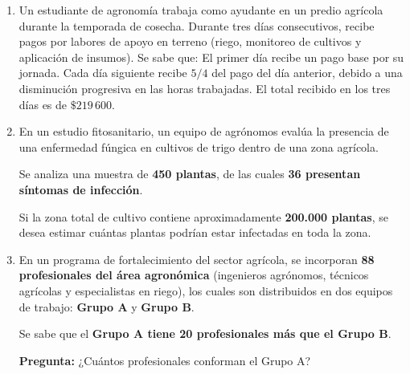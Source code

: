 \documentclass[11pt]{article}
\begin{document}
\begin{enumerate}
	\[
	\frac{3(4x + 120)}{2} - \frac{2(5x - 50)}{3} = 500
	\]
	
	\begin{enumerate}
		\item Resuelva la ecuación.
		\item Interprete el resultado en contexto productivo.
		\item Analice posibles errores de modelación.
	\end{enumerate}
	
	\item Un estudiante de agronomía trabaja como ayudante en un predio agrícola durante la temporada de cosecha. Durante tres días consecutivos, recibe pagos por labores de apoyo en terreno (riego, monitoreo de cultivos y aplicación de insumos). Se sabe que: El primer día recibe un pago base por su jornada. Cada día siguiente recibe $5/4$ del pago del día anterior, debido a una disminución progresiva en las horas trabajadas.
	El total recibido en los tres días es de $\$219\,600$.
	
	\item En un estudio fitosanitario, un equipo de agrónomos evalúa la presencia de una enfermedad fúngica en cultivos de trigo dentro de una zona agrícola.
	
	Se analiza una muestra de \textbf{450 plantas}, de las cuales \textbf{36 presentan síntomas de infección}.
	
	Si la zona total de cultivo contiene aproximadamente \textbf{200.000 plantas}, se desea estimar cuántas plantas podrían estar infectadas en toda la zona.
	
	\item En un programa de fortalecimiento del sector agrícola, se incorporan \textbf{88 profesionales del área agronómica} (ingenieros agrónomos, técnicos agrícolas y especialistas en riego), los cuales son distribuidos en dos equipos de trabajo: \textbf{Grupo A} y \textbf{Grupo B}.
	
	Se sabe que el \textbf{Grupo A tiene 20 profesionales más que el Grupo B}.
	
	\bigskip
	
	\textbf{Pregunta:}  
	¿Cuántos profesionales conforman el Grupo A?
		
				
				
				
				
			\end{enumerate}
			
\end{document}
